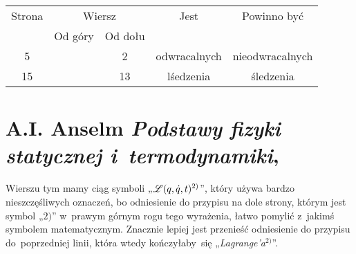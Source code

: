 \documentclass[a4paper,11pt]{article}
\numberwithin{equation}{section}
\begin{document}
\begin{center}

  \begin{tabular}{|c|c|c|c|c|}
    \hline
    Strona & \multicolumn{2}{c|}{Wiersz} & Jest
                              & Powinno być \\ \cline{2-3}
    & Od góry & Od dołu & & \\
    \hline
    5   & &  2 & odwracalnych & nieodwracalnych \\
    15  & & 13 & lśedzenia & śledzenia \\
    \hline
  \end{tabular}

\end{center}

\VerSpaceTwo











\section{A.I. Anselm \textit{Podstawy fizyki statycznej
    i~termodynamiki},
  \parencite{Anselm-Podstawy-fizyki-statystycznej-i-termodynamiki-Pub-1978}}

\vspace{0em}



\vspace{0em}


\noindent
{} Wierszu tym mamy ciąg symboli
„$\mathcal{L}( q, \dot{ q }, t )^{ 2) }$”, który używa bardzo nieszczęśliwych
oznaczeń, bo odniesienie do przypisu na dole strony, którym jest symbol
„$2)$” w~prawym górnym rogu tego wyrażenia, łatwo pomylić z~jakimś symbolem
matematycznym. Znacznie lepiej jest przenieść odniesienie do przypisu
do~poprzedniej linii, która wtedy kończyłaby~się
„\textit{Lagrange’a}$^{ 2) }$”.
\end{document}
